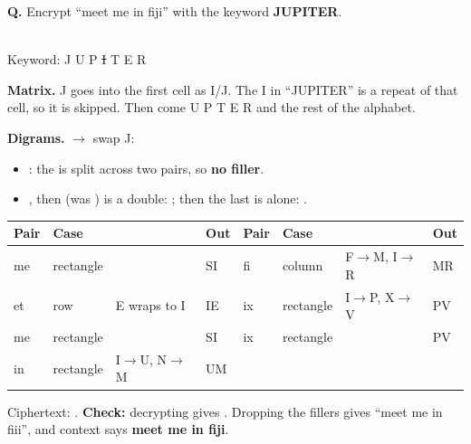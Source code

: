 \begin{worked}
\textbf{Q.} Encrypt ``meet me in fiji'' with the keyword \textbf{JUPITER}.

\begin{minipage}[c]{0.36\textwidth}
\centering
{}\\[2pt]
{\footnotesize Keyword: J U P \sout{I} T E R}
\end{minipage}\hfill
\begin{minipage}[c]{0.6\textwidth}
\textbf{Matrix.} J goes into the first cell as I/J. The I in ``JUPITER'' is a repeat of that cell, so it is skipped. Then come U P T E R and the rest of the alphabet.

\textbf{Digrams.}  $\to$ swap J: 
\begin{itemize}
  \item {}: the  is split across two pairs, so \textbf{no filler}.
  \item {}, then  (was ) is a double: ; then the last  is alone: .
\end{itemize}
\end{minipage}

\begin{center}\small
\begin{tabular}{@{}llll|llll@{}}
\toprule
Pair & Case & & Out & Pair & Case & & Out\\
\midrule
me & rectangle & & SI & fi & column & F$\to$M, I$\to$R & MR\\
et & row & E wraps to I & IE & ix & rectangle & I$\to$P, X$\to$V & PV\\
me & rectangle & & SI & ix & rectangle & & PV\\
in & rectangle & I$\to$U, N$\to$M & UM & & & &\\
\bottomrule
\end{tabular}
\end{center}
Ciphertext: \textbf{}.\quad
\textbf{Check:} decrypting gives . Dropping the fillers gives ``meet me in fiii'', and context says \textbf{meet me in fiji}.
\end{worked}

